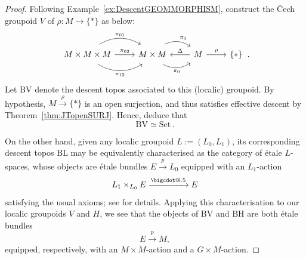 \documentclass[a4paper, 11pt,reqno]{amsart}
\makeatletter
\newcommand{\Set}{\mathrm{Set}}
\newcommand*\bigcdot{\mathpalette\bigcdot@{.5}}
\newcommand*\bigcdot@[2]{\mathbin{\vcenter{\hbox{\scalebox{#2}{$\m@th#1\bullet$}}}}}
\makeatother
\begin{document}
\begin{proof} Following Example~\ref{ex:DescentGEOMMORPHISM}, construct the \v{C}ech groupoid $V$ of $\rho\colon M\rightarrow \{*\}$ as below:
	\begin{equation}\label{eq:KERNELpairGROUPOID}
	\begin{tikzcd} M\times M \times M \ar[r, bend right, shift right=1ex, swap,"\pi_{12}"] \ar[r,"\pi_{02}"] \ar[r,bend left, shift left=1ex,  "\pi_{01}"]& M\times M \ar[r, bend right,shift right=1ex, swap, "\pi_0"] \ar[r, bend left, shift left=1ex, "\pi_1"] & M \ar[l, swap, "\Delta"] \ar[r,"\rho"] & \{*\} 
	\end{tikzcd}\,.
	\end{equation}
Let $\mathrm{BV}$ denote the descent topos associated to this (localic) groupoid. By hypothesis, $M\xrightarrow{\rho}\{*\}$ is an open surjection, and thus satisfies effective descent by Theorem~\ref{thm:JTopenSURJ}. Hence, deduce that
\begin{equation}\label{eq:BV=Set}
\mathrm{BV}\simeq \Set\,.
\end{equation} 
	
On the other hand, given any localic groupoid $L:=(L_0,L_1)$, its corresponding descent topos $\mathrm{BL}$ may be equivalently characterised as the category of \'{e}tale $L$-spaces, whose objects are \'{e}tale bundles $E\xrightarrow{p} L_0$ equipped with an $L_1$-action
$$L_1\times_{L_0} E \xrightarrow{\bigcdot} E$$ 
satisfying the usual axioms; see \cite[\S 5]{Moerdijk} for details. Applying this characterisation to our localic groupoids $V$ and $H$, we see that the objects of $\mathrm{BV}$ and $\mathrm{BH}$ are both étale bundles
$$E\xrightarrow{p}M,$$
equipped, respectively, with an $M\times M$-action and a $G\times M$-action.




\end{proof}
\end{document}

